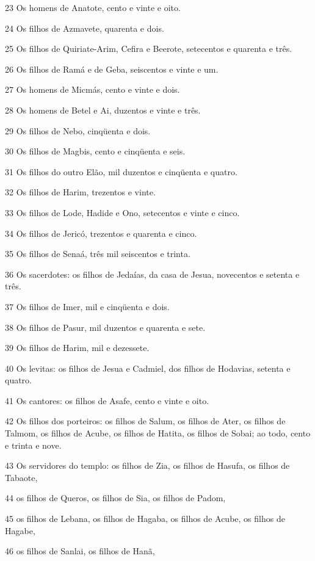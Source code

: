 \par 23 Os homens de Anatote, cento e vinte e oito.
\par 24 Os filhos de Azmavete, quarenta e dois.
\par 25 Os filhos de Quiriate-Arim, Cefira e Beerote, setecentos e quarenta e três.
\par 26 Os filhos de Ramá e de Geba, seiscentos e vinte e um.
\par 27 Os homens de Micmás, cento e vinte e dois.
\par 28 Os homens de Betel e Ai, duzentos e vinte e três.
\par 29 Os filhos de Nebo, cinqüenta e dois.
\par 30 Os filhos de Magbis, cento e cinqüenta e seis.
\par 31 Os filhos do outro Elão, mil duzentos e cinqüenta e quatro.
\par 32 Os filhos de Harim, trezentos e vinte.
\par 33 Os filhos de Lode, Hadide e Ono, setecentos e vinte e cinco.
\par 34 Os filhos de Jericó, trezentos e quarenta e cinco.
\par 35 Os filhos de Senaá, três mil seiscentos e trinta.
\par 36 Os sacerdotes: os filhos de Jedaías, da casa de Jesua, novecentos e setenta e três.
\par 37 Os filhos de Imer, mil e cinqüenta e dois.
\par 38 Os filhos de Pasur, mil duzentos e quarenta e sete.
\par 39 Os filhos de Harim, mil e dezessete.
\par 40 Os levitas: os filhos de Jesua e Cadmiel, dos filhos de Hodavias, setenta e quatro.
\par 41 Os cantores: os filhos de Asafe, cento e vinte e oito.
\par 42 Os filhos dos porteiros: os filhos de Salum, os filhos de Ater, os filhos de Talmom, os filhos de Acube, os filhos de Hatita, os filhos de Sobai; ao todo, cento e trinta e nove.
\par 43 Os servidores do templo: os filhos de Zia, os filhos de Hasufa, os filhos de Tabaote,
\par 44 os filhos de Queros, os filhos de Sia, os filhos de Padom,
\par 45 os filhos de Lebana, os filhos de Hagaba, os filhos de Acube, os filhos de Hagabe,
\par 46 os filhos de Sanlai, os filhos de Hanã,
